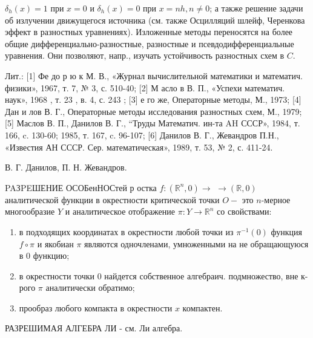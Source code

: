 \documentclass[10pt]{article}
\begin{document}
$\delta_{h}(x)=1$ при $x=0$ и $\delta_{h}(x)=0$ при $x=n h, n \neq 0$; а также решение задачи об излучении движущегося источника (см. также Осцилляций шлейф, Черенкова эффект в разностных уравнениях). Изложенные методы переносятся на более общие дифференциально-разностные, разностные и псевдодифференциальные уравнения. Они позволяют, напр., изучать устойчивость разностных схем в $C$.



Лит.: [1] Фе до р ю к М. В., «Журнал вычислительной математики и математич. физики», 1967, т. 7, № 3, с. 510-40; [2] М асло в В. П., «Успехи математич. наук», 1968 , т. 23 , в. 4, с. 243 ; [3] е го же, Операторные методы, М., 1973; [4] Дан и лов В. Г., Операторные методы исследования разностных схем, М., 1979; [5] Маслов В. П., Данилов В. Г., “Труды Математич. ин-та AH СССР», 1984, т. 166, c. 130-60; 1985, т. 167, c. 96-107; [6] Данилов В. Г., Жевандров П.Н., «Известия АН СССР. Сер. математическая», 1989, т. 53, № 2, с. 411-24.



В. Г. Данилов, П. Н. Жевандров.



PAЗPEШЕНИЕ ОСОБенНОСтей р остка $f:\left(\mathbb{R}^{n}, 0\right) \rightarrow$ $\rightarrow(\mathbb{R}, 0)$ аналитической функции в окрестности критической точки $O-$ это $n$-мерное многообразие $Y$ и аналитическое отображение $\pi: Y \rightarrow \mathbb{R}^{n}$ со свойствами:



\begin{enumerate}

  \item в подходящих координатах в окрестности любой точки из $\pi^{-1}(0)$ функция $f \circ \pi$ и якобиан $\pi$ являются одночленами, умноженными на не обращающуюся в 0 функцию;



  \item в окрестности точки 0 найдется собственное алгебраич. подмножество, вне к-рого $\pi$ аналитически обратимо;



  \item прообраз любого компакта в окрестности $x$ компактен.



\end{enumerate}



РАЗРЕШИМАЯ АЛГЕБРА ЛИ - см. Ли алгебра.
\end{document}

